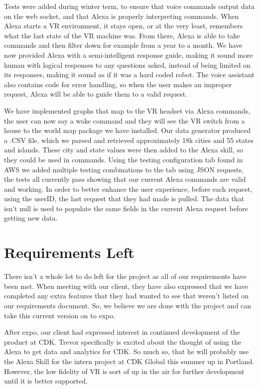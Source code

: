\documentclass[onecolumn, draftclsnofoot,10pt, compsoc]{IEEEtran}
\begin{document}
Tests were added during winter term, to ensure that voice commands output data on the web socket, and that Alexa is properly interpreting commands. When Alexa starts a VR environment, it stays open, or at the very least, remembers what the last state of the VR machine was. From there, Alexa is able to take commands and then filter down for example from a year to a month. We have now provided Alexa with a semi-intelligent response guide, making it sound more human with logical responses to any questions asked, instead of being limited on its responses, making it sound as if it was a hard coded robot. The voice assistant also contains code for error handling, so when the user makes an improper request, Alexa will be able to guide them to a valid request.\newline

 
We have implemented graphs that map to the VR headset via Alexa commands, the user can now say a wake command and they will see the VR switch from a house to the world map package we have installed. Our data generator produced a .CSV file, which we parsed and retrieved approximately 18k cities and 55 states and islands. These city and state values were then added to the Alexa skill, so they could be used in commands. Using the testing configuration tab found in AWS we added multiple testing combinations to the tab using JSON requests, the tests all currently pass showing that our current Alexa commands are valid and working. In order to better enhance the user experience, before each request, using the userID, the last request that they had made is pulled. The data that isn't null is used to populate the same fields in the current Alexa request before getting new data.\newline
\section{Requirements Left}
There isn't a whole lot to do left for the project as all of our requirements have been met. When meeting with our client, they have also expressed that we have completed any extra features that they had wanted to see that weren't listed on our requirements document. So, we believe we are done with the project and can take this current version on to expo. \newline

After expo, our client had expressed interest in continued development of the product at CDK. Trevor specifically is excited about the thought of using the Alexa to get data and analytics for CDK. So much so, that he will probably use the Alexa Skill for the intern project at CDK Global this summer up in Portland. However, the low fidelity of VR is sort of up in the air for further development until it is better supported. \newline
\end{document}
